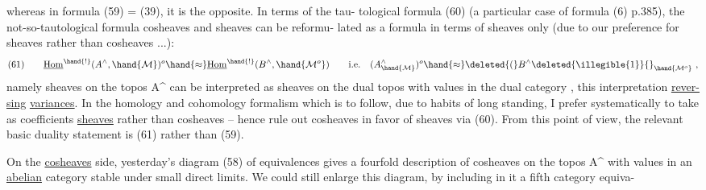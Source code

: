 whereas in formula (59) = (39), it is the opposite. In terms of the tau-%
tological formula (60) (a particular case of formula (6) p.385), the
not-so-tautological formula  cosheaves and sheaves can be reformu-%
lated as a formula in terms of sheaves only (due to our preference for
sheaves rather than cosheaves ...):
\[ (61) \qquad \underline{\mathrm{Hom}}^{\hand{!}}(A^{\wedge},\hand{\mathcal{M}})^{o} \hand{\approx} \underline{\mathrm{Hom}}^{\hand{!}}(B^{\wedge},\hand{\mathcal{M}^{o}}) \qquad \text{i.e.} \quad (A^{\wedge}_{\hand{\mathcal{M}}})^{o} \hand{\approx} \deleted{(}B^{\wedge}\deleted{\illegible{1}}{}_{\hand{\mathcal{M}^{o}}} \ , \]
namely  sheaves on the topos A\^{} can be interpreted as sheaves on the dual
topos with values in the dual category  , this interpretation \uline{rever-}%
\uline{sing} \uline{variances}. In the homology and cohomology formalism which is to
follow, due to  habits of long standing, I prefer systematically to
take as coefficients \uline{sheaves} rather than cosheaves -- hence 
rule out cosheaves in favor of sheaves via (60). From this point of view,
the relevant basic duality statement is (61) rather than (59).

On the \uline{cosheaves} side, yesterday's diagram (58) of equivalences
gives a fourfold description of cosheaves on the topos A\^{} with values in
an \uline{abelian} category  stable under small direct limits. We could still
enlarge this diagram, by  including in it a fifth category equiva-%

